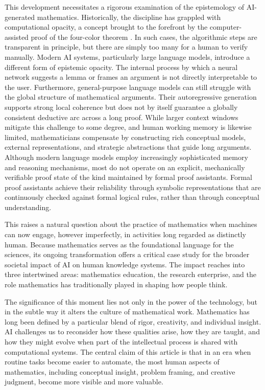 \documentclass[12pt]{article}
\begin{document}
This development necessitates a rigorous examination of the epistemology of AI-generated mathematics. Historically, the discipline has grappled with computational opacity, a concept brought to the forefront by the computer-assisted proof of the four-color theorem \cite{tymoczko1979}. In such cases, the algorithmic steps are transparent in principle, but there are simply too many for a human to verify manually. Modern AI systems, particularly large language models, introduce a different form of epistemic opacity. The internal process by which a neural network suggests a lemma or frames an argument is not directly interpretable to the user. Furthermore, general-purpose language models can still struggle with the global structure of mathematical arguments. Their autoregressive generation supports strong local coherence but does not by itself guarantee a globally consistent deductive arc across a long proof. While larger context windows mitigate this challenge to some degree, and human working memory is likewise limited, mathematicians compensate by constructing rich conceptual models, external representations, and strategic abstractions that guide long arguments. Although modern language models employ increasingly sophisticated memory and reasoning mechanisms, most do not operate on an explicit, mechanically verifiable proof state of the kind maintained by formal proof assistants. Formal proof assistants achieve their reliability through symbolic representations that are continuously checked against formal logical rules, rather than through conceptual understanding.

This raises a natural question about the practice of mathematics when machines can now engage, however imperfectly, in activities long regarded as distinctly human. Because mathematics serves as the foundational language for the sciences, its ongoing transformation offers a critical case study for the broader societal impact of AI on human knowledge systems. The impact reaches into three intertwined areas: mathematics education, the research enterprise, and the role mathematics has traditionally played in shaping how people think.

The significance of this moment lies not only in the power of the technology, but in the subtle way it alters the culture of mathematical work. Mathematics has long been defined by a particular blend of rigor, creativity, and individual insight. AI challenges us to reconsider how these qualities arise, how they are taught, and how they might evolve when part of the intellectual process is shared with computational systems. The central claim of this article is that in an era when routine tasks become easier to automate, the most human aspects of mathematics, including conceptual insight, problem framing, and creative judgment, become more visible and more valuable.
\end{document}
